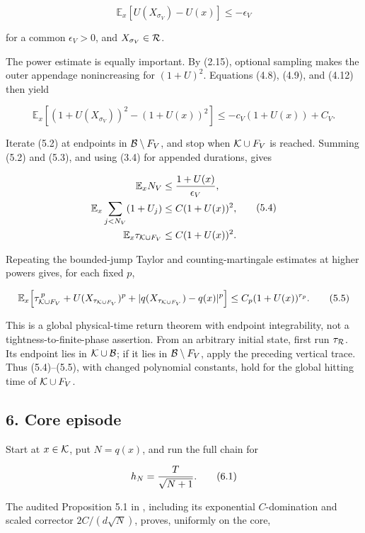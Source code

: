 \[
 \mathbb E_x[U(X_{\sigma_V})-U(x)]\le-\epsilon_V          \tag{5.2}
\]

for a common \(\epsilon_V>0\), and \(X_{\sigma_V}\in{\cal R}\).

The power estimate is equally important. By (2.15), optional sampling
makes the outer appendage nonincreasing for \((1+U)^2\). Equations
(4.8), (4.9), and (4.12) then yield

\[
 \mathbb E_x[(1+U(X_{\sigma_V}))^2-(1+U(x))^2]
 \le-c_V(1+U(x))+C_V.                                    \tag{5.3}
\]

Iterate (5.2) at endpoints in \({\cal B}\mathbin{\backslash} F_V\), and
stop when \({\cal K}\cup F_V\) is reached. Summing (5.2) and (5.3), and
using (3.4) for appended durations, gives

\[
\begin{split}
 \mathbb E_xN_V&\le {1+U(x)\over\epsilon_V},\\
 \mathbb E_x\sum_{j<N_V}(1+U_j)&\le C(1+U(x))^2,\\
 \mathbb E_x\tau_{{\cal K}\cup F_V}&\le C(1+U(x))^2.
\end{split}                                               \tag{5.4}
\]

Repeating the bounded-jump Taylor and counting-martingale estimates at
higher powers gives, for each fixed \(p\),

\[
 \mathbb E_x\!\left[
 \tau_{{\cal K}\cup F_V}^{\,p}
 +U(X_{\tau_{{\cal K}\cup F_V}})^p
 +|q(X_{\tau_{{\cal K}\cup F_V}})-q(x)|^p\right]
 \le C_p(1+U(x))^{r_p}.                                  \tag{5.5}
\]

This is a global physical-time return theorem with endpoint
integrability, not a tightness-to-finite-phase assertion. From an
arbitrary initial state, first run \(\tau_{\cal R}\). Its endpoint lies
in \({\cal K}\cup{\cal B}\); if it lies in
\({\cal B}\mathbin{\backslash} F_V\), apply the preceding vertical
trace. Thus (5.4)--(5.5), with changed polynomial constants, hold for
the global hitting time of \({\cal K}\cup F_V\).

\subsection{6. Core episode}

Start at \(x\in{\cal K}\), put \(N=q(x)\), and run the full chain for

\[
 h_N={T\over\sqrt{N+1}}.                                 \tag{6.1}
\]

The audited Proposition 5.1 in \texttt{},
including its exponential \(C\)-domination and scaled corrector
\(2C/(d\sqrt N)\), proves, uniformly on the core,

